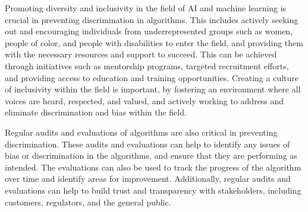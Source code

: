 \documentclass[
	12pt,
    a4paper,
    egregdoesnotlikesansseriftitles, %
    toc=chapterentrywithdots,
    oneside, openany,
    titlepage,
    parskip=half,
    headings=normal,  %
    listof=totoc,
    bibliography=totocnumbered,
    index=totoc,
    captions=tableheading,  %
    listof=flat,
    numbers=noenddot, %
    final]
    {scrbook}
\begin{document}
%
%

Promoting diversity and inclusivity in the field of AI and machine learning is crucial in preventing discrimination in algorithms. 
This includes actively seeking out and encouraging individuals from underrepresented groups such as women, people of color, and people with disabilities to enter the field, and providing them with the necessary resources and support to succeed. 
This can be achieved through initiatives such as mentorship programs, targeted recruitment efforts, and providing access to education and training opportunities. 
Creating a culture of inclusivity within the field is important, by fostering an environment where all voices are heard, respected, and valued, and actively working to address and eliminate discrimination and bias within the field.

Regular audits and evaluations of algorithms are also critical in preventing discrimination. These audits and evaluations can help to identify any issues of bias or discrimination in the algorithms, and ensure that they are performing as intended. 
The evaluations can also be used to track the progress of the algorithm over time and identify areas for improvement. 
Additionally, regular audits and evaluations can help to build trust and transparency with stakeholders, including customers, regulators, and the general public.
\end{document}
